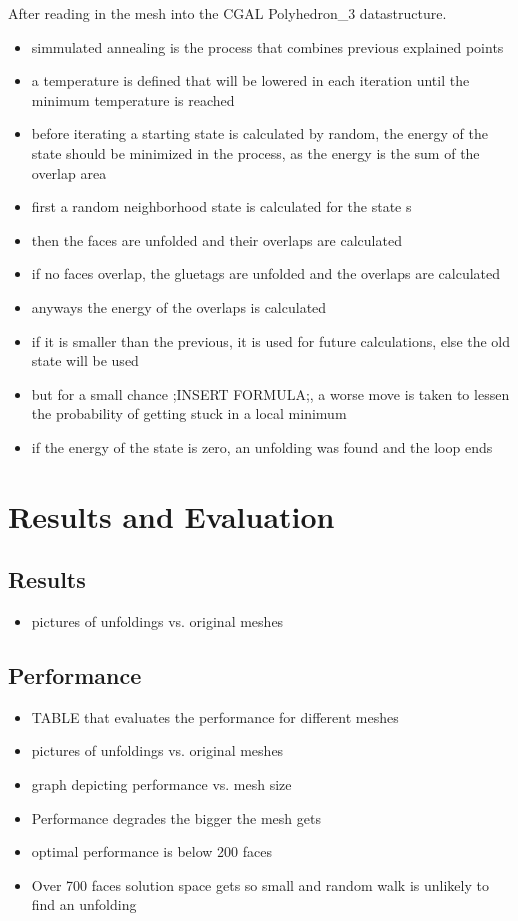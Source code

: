 \documentclass[draft,final]{vutinfth} %
\begin{document}
After reading in the mesh into the CGAL Polyhedron\_3 datastructure.

\begin{itemize}
	\item simmulated annealing is the process that combines previous explained points
	\item a temperature is defined that will be lowered in each iteration until the minimum temperature is reached
	\item before iterating a starting state is calculated by random, the energy of the state should be minimized in the process, as the energy is the sum of the overlap area
	\item first a random neighborhood state is calculated for the state s
	\item then the faces are unfolded and their overlaps are calculated
	\item if no faces overlap, the gluetags are unfolded and the overlaps are calculated
	\item anyways the energy of the overlaps is calculated	
	\item if it is smaller than the previous, it is used for future calculations, else the old state will be used
	\item but for a small chance ;INSERT FORMULA;, a worse move is taken to lessen the probability of getting stuck in a local minimum
	\item if the energy of the state is zero, an unfolding was found and the loop ends
\end{itemize}

\chapter{Results and Evaluation}
\label{chap:reseval}

\section{Results}

\begin{itemize}
	\item pictures of unfoldings vs. original meshes
\end{itemize}

\section{Performance}

\begin{itemize}
	\item TABLE that evaluates the performance for different meshes
	\item pictures of unfoldings vs. original meshes
	\item graph depicting performance vs. mesh size
	\item Performance degrades the bigger the mesh gets
	\item optimal performance is below 200 faces
	\item Over 700 faces solution space gets so small and random walk is unlikely to find an unfolding
\end{itemize}
\end{document}
